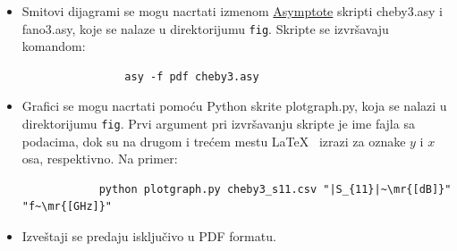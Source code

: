 \documentclass[a4paper]{article}
\begin{document}
\begin{itemize}
	\item Smitovi dijagrami se mogu nacrtati izmenom \href{https://asymptote.sourceforge.io/}{Asymptote} skripti cheby3.asy i fano3.asy, koje se nalaze u direktorijumu \texttt{fig}.
			Skripte se izvršavaju komandom:
			\begin{verbatim} 
				asy -f pdf cheby3.asy 
			\end{verbatim}
	\item Grafici se mogu nacrtati pomoću Python skrite plotgraph.py,  koja se nalazi u direktorijumu \texttt{fig}. Prvi argument pri izvršavanju skripte je ime fajla sa podacima, dok su na drugom i trećem mestu \LaTeX
	~izrazi za oznake $y$ i $x$ osa, respektivno. Na primer:
		\begin{verbatim}
			python plotgraph.py cheby3_s11.csv "|S_{11}|~\mr{[dB]}" "f~\mr{[GHz]}"
		\end{verbatim}

	\item Izveštaji se predaju isključivo u PDF formatu.
\end{itemize}



\end{document}
